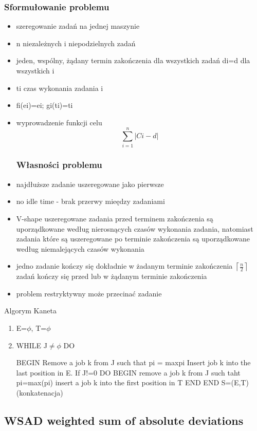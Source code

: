 \documentclass[12pt,a4paper]{article}
\begin{document}
\subsubsection{Sformułowanie problemu}
\begin{itemize}
\item szeregowanie zadań na jednej maszynie
\item n niezależnych i niepodzielnych zadań
\item jeden, wspólny, żądany termin zakończenia dla wszystkich zadań di=d dla wszystkich i
\item ti czas wykonania zadania i
\item fi(ei)=ei; gi(ti)=ti
\item wyprowadzenie funkcji celu
\begin{equation}
\sum\limits_{i=1}^{n}\left | Ci-d \right |
\end{equation}
\subsubsection{Własności problemu}
\item najdłuższe zadanie uszeregowane jako pierwsze
\item no idle time - brak przerwy mieędzy zadaniami
\item V-shape uszeregowane zadania przed terminem zakończenia są uporządkowane według nierosnących czasów wykonania zadania, natomiast zadania które są uszeregowane po terminie zakończenia są uporządkowane według niemalejących czasów wykonania
\item jedno zadanie kończy się dokładnie w żadanym terminie zakończenia $\left \lceil \frac{n}{2} \right \rceil$ zadań kończy się przed lub w żądanym terminie zakończenia
\item problem restryktywny może przecinać zadanie
\end{itemize}

Algorym Kaneta
\begin{enumerate}
\item E=$\phi$, T=$\phi$
\item WHILE J$\neq \phi$ DO

BEGIN
Remove a job k from J such that pi = max{pi}
Insert job k into the last position in E.
If J!=0 DO
BEGIN remove a job k from J such taht pi=max(pi)
insert a job k into the first position in T
END
END
S=(E,T) (konkatenacja)
\end{enumerate}

\subsection{WSAD weighted sum of absolute deviations}
\end{document}
